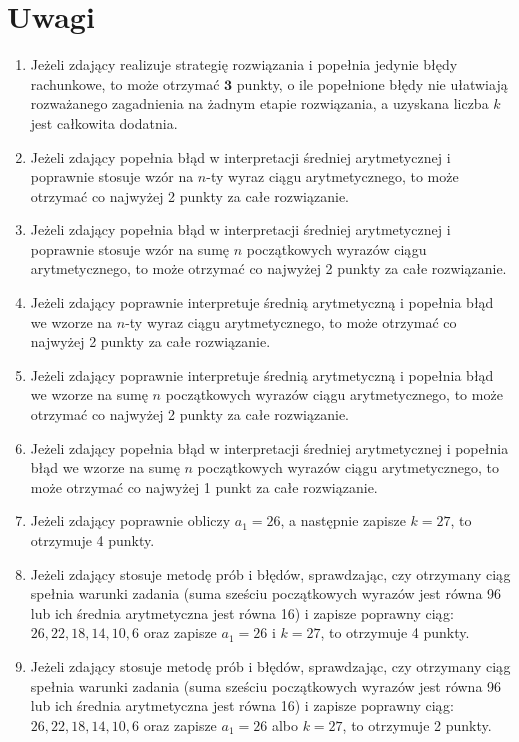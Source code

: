 \documentclass[10pt]{article}
\begin{document}
\section*{Uwagi}
\begin{enumerate}
  \item Jeżeli zdający realizuje strategię rozwiązania i popełnia jedynie błędy rachunkowe, to może otrzymać $\mathbf{3}$ punkty, o ile popełnione błędy nie ułatwiają rozważanego zagadnienia na żadnym etapie rozwiązania, a uzyskana liczba $k$ jest całkowita dodatnia.
  \item Jeżeli zdający popełnia błąd w interpretacji średniej arytmetycznej i poprawnie stosuje wzór na $n$-ty wyraz ciągu arytmetycznego, to może otrzymać co najwyżej 2 punkty za całe rozwiązanie.
  \item Jeżeli zdający popełnia błąd w interpretacji średniej arytmetycznej i poprawnie stosuje wzór na sumę $n$ początkowych wyrazów ciągu arytmetycznego, to może otrzymać co najwyżej 2 punkty za całe rozwiązanie.
  \item Jeżeli zdający poprawnie interpretuje średnią arytmetyczną i popełnia błąd we wzorze na $n$-ty wyraz ciągu arytmetycznego, to może otrzymać co najwyżej 2 punkty za całe rozwiązanie.
  \item Jeżeli zdający poprawnie interpretuje średnią arytmetyczną i popełnia błąd we wzorze na sumę $n$ początkowych wyrazów ciągu arytmetycznego, to może otrzymać co najwyżej 2 punkty za całe rozwiązanie.
  \item Jeżeli zdający popełnia błąd w interpretacji średniej arytmetycznej i popełnia błąd we wzorze na sumę $n$ początkowych wyrazów ciągu arytmetycznego, to może otrzymać co najwyżej 1 punkt za całe rozwiązanie.
  \item Jeżeli zdający poprawnie obliczy $a_{1}=26$, a następnie zapisze $k=27$, to otrzymuje 4 punkty.
  \item Jeżeli zdający stosuje metodę prób i błędów, sprawdzając, czy otrzymany ciąg spełnia warunki zadania (suma sześciu początkowych wyrazów jest równa 96 lub ich średnia arytmetyczna jest równa 16) i zapisze poprawny ciąg: $26,22,18,14,10,6$ oraz zapisze $a_{1}=26$ i $k=27$, to otrzymuje 4 punkty.
  \item Jeżeli zdający stosuje metodę prób i błędów, sprawdzając, czy otrzymany ciąg spełnia warunki zadania (suma sześciu początkowych wyrazów jest równa 96 lub ich średnia arytmetyczna jest równa 16) i zapisze poprawny ciąg: $26,22,18,14,10,6$ oraz zapisze $a_{1}=26$ albo $k=27$, to otrzymuje 2 punkty.

\end{enumerate}
\end{document}

